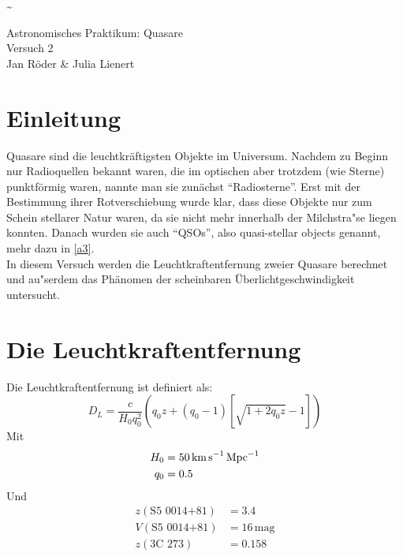 \documentclass[12pt]{article}
\begin{document}
	\pagestyle{empty}
	\textasciitilde

\begin{titlepage}
    \centering
    \bigskip
	\huge{Astronomisches Praktikum: Quasare}\\
	\bigskip
    \large{Versuch 2}\\
    \bigskip
    \large{Jan R\"{o}der \& Julia Lienert}
    \bigskip
    \tableofcontents
\end{titlepage}





\section{Einleitung}

Quasare sind die leuchtkr\"{a}ftigsten Objekte im Universum. Nachdem zu Beginn nur Radioquellen bekannt waren, die im optischen aber trotzdem (wie Sterne) punktf\"{o}rmig waren, nannte man sie zun\"{a}chst ``Radiosterne''. Erst mit der Bestimmung ihrer Rotverschiebung wurde klar, dass diese Objekte nur zum Schein stellarer Natur waren, da sie nicht mehr innerhalb der Milchstra"se liegen konnten. Danach wurden sie auch ``QSOs'', also quasi-stellar objects genannt, mehr dazu in \ref{a3}.\\
In diesem Versuch werden die Leuchtkraftentfernung zweier Quasare berechnet und au"serdem das Ph\"{a}nomen der scheinbaren \"{U}berlichtgeschwindigkeit untersucht.


\section{Die Leuchtkraftentfernung}

Die Leuchtkraftentfernung ist definiert als:
\begin{equation}\label{eq:D_L}
	D_L=\frac{c}{H_0q_0^2}\left( q_0z+(q_0-1)\left[  \sqrt{1+2q_0z} -1 \right]  \right)
\end{equation}
Mit
\begin{align*}
	H_0 &= 50\text{\,km\,s}^{-1}\,\text{Mpc}^{-1} \\
	q_0 &= 0.5
\end{align*}
Und
\begin{align*}
	z(\text{S5 0014+81}) &= 3.4 \\
	V(\text{S5 0014+81}) &= 16\,\text{mag} \\
	z(\text{3C 273}) &= 0.158 
\end{align*}
\end{document}
